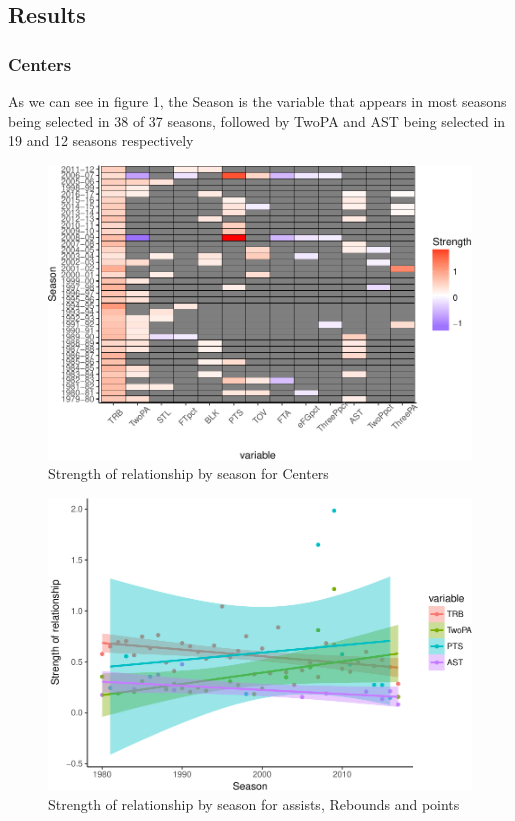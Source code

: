 \documentclass[]{elsarticle} %
\makeatletter
\def\maxwidth{\ifdim\Gin@nat@width>\linewidth\linewidth
\else\Gin@nat@width\fi}
\let\Oldincludegraphics\includegraphics
\renewcommand{\includegraphics}[1]{\Oldincludegraphics[width=\maxwidth]{#1}}
\makeatother
\begin{document}
\subsection{Results}\label{results}

\subsubsection{Centers}\label{centers}

As we can see in figure 1, the Season is the variable that appears in
most seasons being selected in 38 of 37 seasons, followed by TwoPA and
AST being selected in 19 and 12 seasons respectively

\begin{figure}[htbp]
\centering
\includegraphics{Coaching_Selection_files/figure-latex/unnamed-chunk-6-1.pdf}
\caption{Strength of relationship by season for Centers}
\end{figure}

\begin{figure}[htbp]
\centering
\includegraphics{Coaching_Selection_files/figure-latex/unnamed-chunk-7-1.pdf}
\caption{Strength of relationship by season for assists, Rebounds and
points}
\end{figure}
\end{document}
